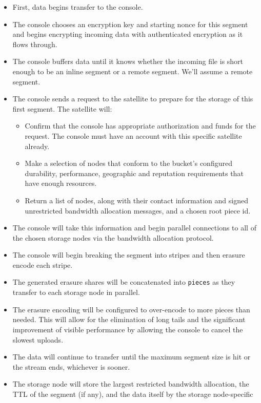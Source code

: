 \documentclass[11pt,fleqn,openany]{book}
\newcommand{\x}[1]{{\tt #1}} \newcommand{\code}[1]{{\tt #1}}
\begin{document}
\begin{itemize}
\item First, data begins transfer to the console.
\item The console chooses an encryption key and starting nonce for
  this segment and begins encrypting incoming data with authenticated
  encryption as it flows through.
\item The console buffers data until it knows whether the incoming file is
short enough to be an inline segment or a remote segment. We'll assume a remote
segment.
\item The console sends a request to the satellite to prepare for the storage
of this first segment. The satellite will:
  \begin{itemize}
  \item Confirm that the console has appropriate authorization and funds for
    the request. The console must have an account with this
specific satellite already.
  \item Make a selection of nodes that conform to the bucket's configured
    durability, performance, geographic and reputation requirements that have
    enough resources.
  \item Return a list of nodes, along with their contact information and
    signed unrestricted bandwidth allocation messages, and a chosen root piece
    id.
  \end{itemize}
\item The console will take this information and begin parallel connections to
  all of the chosen storage nodes via the bandwidth allocation protocol.
\item The console will begin breaking the segment into stripes and then
  erasure encode each stripe.
\item The generated erasure shares will be concatenated into \x{pieces} as they
  transfer to each storage node in parallel.
\item The erasure encoding will be configured to over-encode to more pieces
  than needed. This will allow for the elimination of long tails and the
  significant improvement of visible performance by allowing the console to
  cancel the slowest uploads.
\item The data will continue to transfer until the maximum segment size is hit
  or the stream ends, whichever is sooner.
\item The storage node will store the largest restricted bandwidth allocation,
the
  TTL of the segment (if any), and the data itself by the storage node-specific

\end{itemize}
\end{document}
